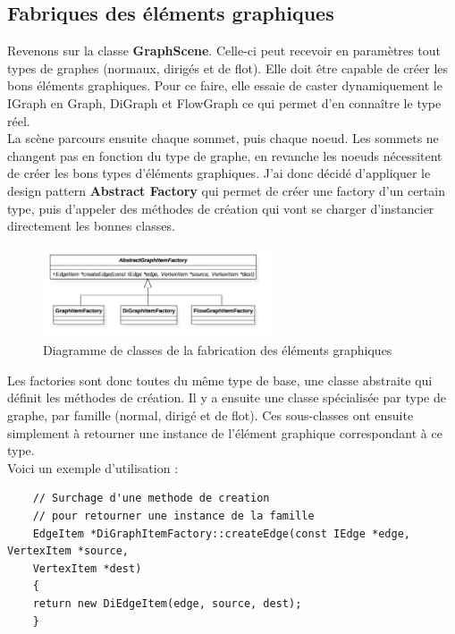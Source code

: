 \documentclass[french]{article}
\begin{document}
	\subsection{Fabriques des éléments graphiques}
	Revenons sur la classe \textbf{GraphScene}. Celle-ci peut recevoir en paramètres tout types de graphes (normaux, dirigés et de flot). Elle doit être capable de créer les bons éléments graphiques. Pour ce faire, elle essaie de caster dynamiquement le IGraph en Graph, DiGraph et FlowGraph ce qui permet d'en connaître le type réel. \\
	
	La scène parcours ensuite chaque sommet, puis chaque noeud. Les sommets ne changent pas en fonction du type de graphe, en revanche les noeuds nécessitent de créer les bons types d'éléments graphiques. J'ai donc décidé d'appliquer le design pattern \textbf{Abstract Factory} qui permet de créer une factory d'un certain type, puis d'appeler des méthodes de création qui vont se charger d'instancier directement les bonnes classes.
	
	\begin{figure}[H]
		\centering
		\includegraphics[width=0.6\textwidth]{Conception/visualization/graphitemsfactories.png}
		\caption{Diagramme de classes de la fabrication des éléments graphiques}
	\end{figure}
	
	Les factories sont donc toutes du même type de base, une classe abstraite qui définit les méthodes de création. Il y a ensuite une classe spécialisée par type de graphe, par famille (normal, dirigé et de flot). Ces sous-classes ont ensuite simplement à retourner une instance de l'élément graphique correspondant à ce type. \\
	
	Voici un exemple d'utilisation :
	
	\begin{lstlisting}
	// Surchage d'une methode de creation
	// pour retourner une instance de la famille
	EdgeItem *DiGraphItemFactory::createEdge(const IEdge *edge, VertexItem *source,
	VertexItem *dest)
	{
	return new DiEdgeItem(edge, source, dest);
	}
	\end{lstlisting}
	
\end{document}
